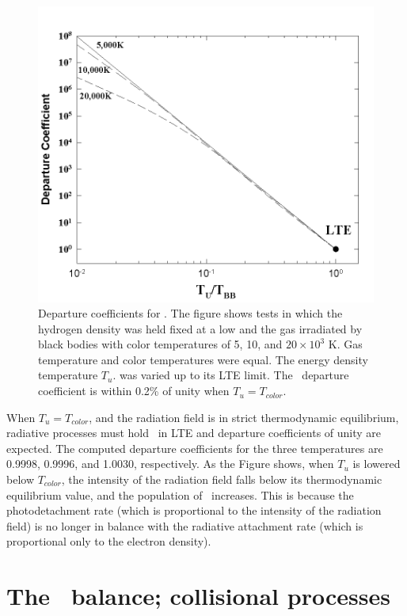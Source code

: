 \begin{figure}
\centering
\label{fig:Hmi_vs_U}
\includegraphics[scale=0.7]{Hmi_vs_U}
\caption[\hminus\ departure coefficients vs radiation energy density]{Departure coefficients for \hminus.  The figure shows tests in which
the hydrogen density was held fixed at a low and the gas irradiated by black
bodies with color temperatures of 5, 10, and $20 \times 10^3$ K.  Gas temperature
and color temperatures were equal. The energy density temperature $T_u$. was
varied up to its LTE limit.  The \hminus\ departure coefficient is within 0.2\%
of unity when $T_u = T_{color}$.}
\end{figure}

When $T_u = T_{color}$, and the radiation field is in strict thermodynamic
equilibrium, radiative processes must hold \hminus\ in LTE and departure
coefficients of unity are expected.  The computed departure coefficients
for the three temperatures are 0.9998, 0.9996, and 1.0030, respectively.
As the Figure shows, when $T_u$ is lowered below $T_{color}$, the intensity of the
radiation field falls below its thermodynamic equilibrium value, and the
population of \hminus\ increases.  This is because the photodetachment rate (which
is proportional to the intensity of the radiation field) is no longer in
balance with the radiative attachment rate (which is proportional only to
the electron density).

\section{The \hminus\ balance; collisional processes}

